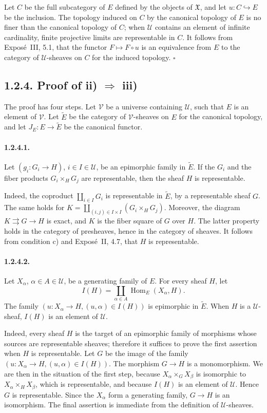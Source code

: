 \documentclass[11pt]{article}
\newcommand{\U}{\mathcal{U}}
\newcommand{\V}{\mathcal{V}}
\newcommand{\Hom}{\operatorname{Hom}}
\newcommand{\qedtext}{\hfill\(\square\)}
\begin{document}
Let \(C\) be the full subcategory of \(E\) defined by the objects of \(\mathfrak X\), and let \(u:C\hookrightarrow E\) be the inclusion. The topology induced on \(C\) by the canonical topology of \(E\) is no finer than the canonical topology of \(C\); when \(\U\) contains an element of infinite cardinality, finite projective limits are representable in \(C\). It follows from Expos\'e~III, 5.1, that the functor \(F\mapsto F\circ u\) is an equivalence from \(E\) to the category of \(\U\)-sheaves on \(C\) for the induced topology. \qedtext

\subsection*{1.2.4. Proof of ii) \(\Rightarrow\) iii)}
The proof has four steps. Let \(\V\) be a universe containing \(\U\), such that \(E\) is an element of \(\V\). Let \(\widetilde E\) be the category of \(\V\)-sheaves on \(E\) for the canonical topology, and let \(J_E:E\to\widetilde E\) be the canonical functor.

\paragraph{1.2.4.1.} Let \((g_i:G_i\to H)\), \(i\in I\in\U\), be an epimorphic family in \(\widetilde E\). If the \(G_i\) and the fiber products \(G_i\times_HG_j\) are representable, then the sheaf \(H\) is representable.

Indeed, the coproduct \(\coprod_{i\in I}G_i\) is representable in \(\widetilde E\), by a representable sheaf \(G\). The same holds for \(K=\coprod_{(i,j)\in I\times I}(G_i\times_HG_j)\). Moreover, the diagram \(K\rightrightarrows G\to H\) is exact, and \(K\) is the fiber square of \(G\) over \(H\). The latter property holds in the category of presheaves, hence in the category of sheaves. It follows from condition c) and Expos\'e~II, 4.7, that \(H\) is representable.

\paragraph{1.2.4.2.} Let \(X_\alpha\), \(\alpha\in A\in\U\), be a generating family of \(E\). For every sheaf \(H\), let
\[
I(H)=\coprod_{\alpha\in A}\Hom_E(X_\alpha,H).
\]
The family \((u:X_\alpha\to H,(u,\alpha)\in I(H))\) is epimorphic in \(\widetilde E\). When \(H\) is a \(\U\)-sheaf, \(I(H)\) is an element of \(\U\).

Indeed, every sheaf \(H\) is the target of an epimorphic family of morphisms whose sources are representable sheaves; therefore it suffices to prove the first assertion when \(H\) is representable. Let \(G\) be the image of the family \((u:X_\alpha\to H,(u,\alpha)\in I(H))\). The morphism \(G\to H\) is a monomorphism. We are then in the situation of the first step, because \(X_\alpha\times_GX_\beta\) is isomorphic to \(X_\alpha\times_HX_\beta\), which is representable, and because \(I(H)\) is an element of \(\U\). Hence \(G\) is representable. Since the \(X_\alpha\) form a generating family, \(G\to H\) is an isomorphism. The final assertion is immediate from the definition of \(\U\)-sheaves.
\end{document}
